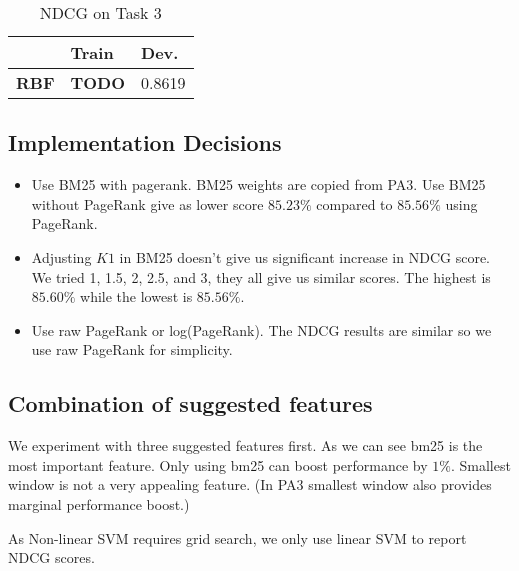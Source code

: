 \documentclass{article}
\begin{document}
\begin{table}[!htb]
    \centering
    \begin{tabular}{| r | l | l |}
        \hline
        & \textbf{Train} & \textbf {Dev.} \\
        \hline
        \textbf{RBF} & \textbf{TODO} & 0.8619 \\
        \hline
    \end{tabular}
    \caption{NDCG on Task 3}
\end{table}

\subsection{Implementation Decisions}

\begin{itemize}
    \item Use BM25 with pagerank. BM25 weights are copied from PA3. Use BM25 without PageRank give as lower score $85.23\%$ compared to $85.56\%$ using PageRank.
    \item Adjusting $K1$ in BM25 doesn't give us significant increase in NDCG score. We tried 1, 1.5, 2, 2.5, and 3, they all give us similar scores. The highest is $85.60\%$ while the lowest is $85.56\%$.
    \item Use raw PageRank or log(PageRank). The NDCG results are similar so we use raw PageRank for simplicity.
\end{itemize}

\subsection{Combination of suggested features}

We experiment with three suggested features first. As we can see bm25 is the most important feature. Only using bm25 can boost performance by $1\%$. Smallest window is not a very appealing feature. (In PA3 smallest window also provides marginal performance boost.)

As Non-linear SVM requires grid search, we only use linear SVM to report NDCG scores.
\end{document}
